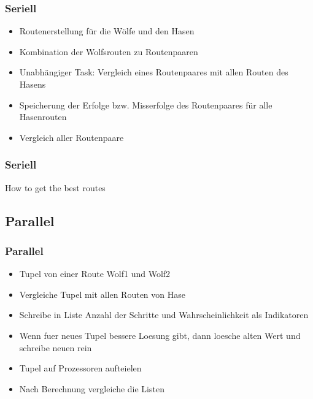 \documentclass{beamer}
\begin{document}
\begin{frame}
\frametitle{Seriell}
\begin{itemize}
\item Routenerstellung für die Wölfe und den Hasen
\item Kombination der Wolfsrouten zu Routenpaaren
\item Unabhängiger Task: Vergleich eines Routenpaares mit allen Routen des Hasens
\item Speicherung der Erfolge bzw. Misserfolge des Routenpaares für alle Hasenrouten
\item Vergleich aller Routenpaare
\end{itemize}
\end{frame}



\begin{frame}
\begin{algorithm}[H]
\frametitle{Seriell}
 {
 }
 \caption{How to get the best routes}
\end{algorithm}
\end{frame}

\subsection{Parallel}
\begin{frame}
\frametitle{Parallel}
\begin{itemize}
\item Tupel von einer Route Wolf1 und Wolf2
\item Vergleiche Tupel mit allen Routen von Hase
\item Schreibe in Liste Anzahl der Schritte und Wahrscheinlichkeit als Indikatoren
\item Wenn fuer neues Tupel bessere Loesung gibt, dann loesche alten Wert und schreibe neuen rein

\item Tupel auf Prozessoren aufteielen
\item Nach Berechnung vergleiche die Listen
\end{itemize}
\end{frame}
\end{document}
